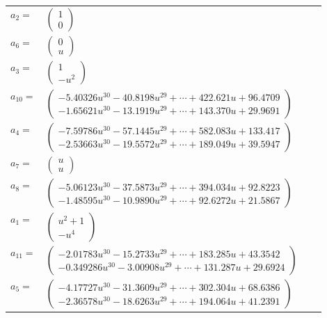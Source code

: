 \documentclass[1p]{elsarticle_modified}
\theoremstyle{definition}
\begin{document}
\begin{tabular}{m{7pt} m{180pt} m{7pt} m{180pt} }
\flushright $a_{2}=$&$\begin{pmatrix}1\\0\end{pmatrix}$ \\
\flushright $a_{6}=$&$\begin{pmatrix}0\\u\end{pmatrix}$ \\
\flushright $a_{3}=$&$\begin{pmatrix}1\\- u^2\end{pmatrix}$ \\
\flushright $a_{10}=$&$\begin{pmatrix}-5.40326 u^{30}-40.8198 u^{29}+\cdots+422.621 u+96.4709\\-1.65621 u^{30}-13.1919 u^{29}+\cdots+143.370 u+29.9691\end{pmatrix}$ \\
\flushright $a_{4}=$&$\begin{pmatrix}-7.59786 u^{30}-57.1445 u^{29}+\cdots+582.083 u+133.417\\-2.53663 u^{30}-19.5572 u^{29}+\cdots+189.049 u+39.5947\end{pmatrix}$ \\
\flushright $a_{7}=$&$\begin{pmatrix}u\\u\end{pmatrix}$ \\
\flushright $a_{8}=$&$\begin{pmatrix}-5.06123 u^{30}-37.5873 u^{29}+\cdots+394.034 u+92.8223\\-1.48595 u^{30}-10.9890 u^{29}+\cdots+92.6272 u+21.5867\end{pmatrix}$ \\
\flushright $a_{1}=$&$\begin{pmatrix}u^2+1\\- u^4\end{pmatrix}$ \\
\flushright $a_{11}=$&$\begin{pmatrix}-2.01783 u^{30}-15.2733 u^{29}+\cdots+183.285 u+43.3542\\-0.349286 u^{30}-3.00908 u^{29}+\cdots+131.287 u+29.6924\end{pmatrix}$ \\
\flushright $a_{5}=$&$\begin{pmatrix}-4.17727 u^{30}-31.3609 u^{29}+\cdots+302.304 u+68.6386\\-2.36578 u^{30}-18.6263 u^{29}+\cdots+194.064 u+41.2391\end{pmatrix}$ \\

\end{tabular}
\end{document}
